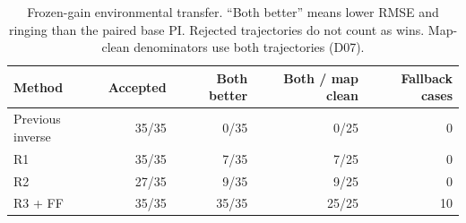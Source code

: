 \begin{table}[htbp]\centering\small\setlength{\tabcolsep}{4pt}\begin{tabular}{@{}lrrrr@{}}\toprule
Method & Accepted & Both better & Both / map clean & Fallback cases\\\midrule
Previous inverse & 35/35 & 0/35 & 0/25 & 0\\
R1 & 35/35 & 7/35 & 7/25 & 0\\
R2 & 27/35 & 9/35 & 9/25 & 0\\
R3 + FF & 35/35 & 35/35 & 25/25 & 10\\
\bottomrule\end{tabular}\caption{Frozen-gain environmental transfer. ``Both better'' means lower RMSE and ringing than the paired base PI. Rejected trajectories do not count as wins. Map-clean denominators use both trajectories (D07).}\label{tab:remedy_grid}\end{table}